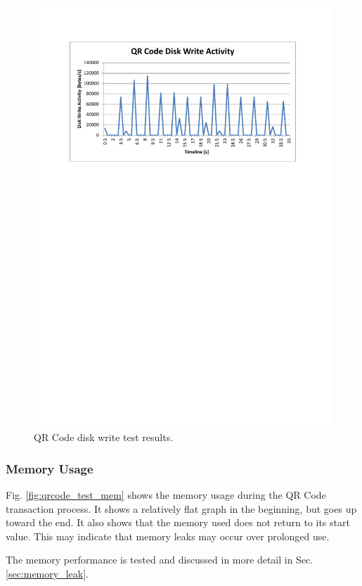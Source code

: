 \begin{figure}
 \centering 
 \includegraphics[clip=true, trim = 0 530 0 70,
 scale=0.7]{qrcode_test_disk}
 \caption{QR Code disk write test results.}
 \label{fig:qrcode_test_disk}
\end{figure}

\subsubsection{Memory Usage}

Fig. \ref{fig:qrcode_test_mem} shows the memory usage during the QR Code transaction
process. It shows a relatively flat graph in the beginning, but goes up toward the end. 
It also shows that the memory used does not return to its start value. This may indicate
that memory leaks may occur over prolonged use.

The memory performance is tested and discussed in more detail in Sec.
\ref{sec:memory_leak}.

